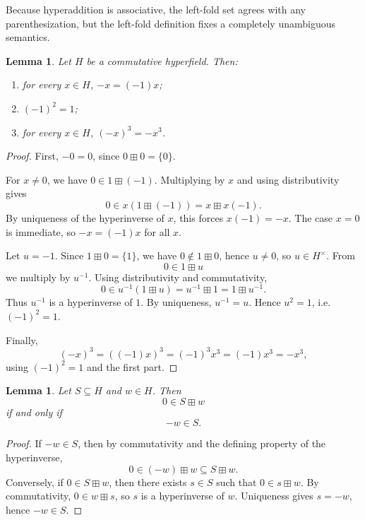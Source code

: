 \documentclass[12pt]{article}
\newtheorem{lemma}[theorem]{Lemma}
\theoremstyle{definition}
\theoremstyle{remark}
\numberwithin{equation}{section}
\begin{document}
Because hyperaddition is associative, the left-fold set agrees with any parenthesization, but the left-fold definition fixes a completely unambiguous semantics.

\begin{lemma}\label{lem:negation}
Let \(H\) be a commutative hyperfield. Then:
\begin{enumerate}
\item for every \(x\in H\), \(-x=(-1)x\);
\item \((-1)^2=1\);
\item for every \(x\in H\), \((-x)^3=-x^3\).
\end{enumerate}
\end{lemma}

\begin{proof}
First, \(-0=0\), since \(0\boxplus 0=\{0\}\).

For \(x\neq 0\), we have \(0\in 1\boxplus(-1)\). Multiplying by \(x\) and using distributivity gives
\[
0\in x(1\boxplus(-1))=x\boxplus x(-1).
\]
By uniqueness of the hyperinverse of \(x\), this forces \(x(-1)=-x\). The case \(x=0\) is immediate, so \(-x=(-1)x\) for all \(x\).

Let \(u=-1\). Since \(1\boxplus 0=\{1\}\), we have \(0\notin 1\boxplus 0\), hence \(u\neq 0\), so \(u\in H^\times\). From
\[
0\in 1\boxplus u
\]
we multiply by \(u^{-1}\). Using distributivity and commutativity,
\[
0\in u^{-1}(1\boxplus u)=u^{-1}\boxplus 1=1\boxplus u^{-1}.
\]
Thus \(u^{-1}\) is a hyperinverse of \(1\). By uniqueness, \(u^{-1}=u\). Hence \(u^2=1\), i.e.\ \((-1)^2=1\).

Finally,
\[
(-x)^3=((-1)x)^3=(-1)^3x^3=(-1)x^3=-x^3,
\]
using \((-1)^2=1\) and the first part.
\end{proof}

\begin{lemma}\label{lem:reversal}
Let \(S\subseteq H\) and \(w\in H\). Then
\[
0\in S\boxplus w
\]
if and only if
\[
-w\in S.
\]
\end{lemma}

\begin{proof}
If \(-w\in S\), then by commutativity and the defining property of the hyperinverse,
\[
0\in (-w)\boxplus w\subseteq S\boxplus w.
\]
Conversely, if \(0\in S\boxplus w\), then there exists \(s\in S\) such that \(0\in s\boxplus w\). By commutativity, \(0\in w\boxplus s\), so \(s\) is a hyperinverse of \(w\). Uniqueness gives \(s=-w\), hence \(-w\in S\).
\end{proof}
\end{document}
